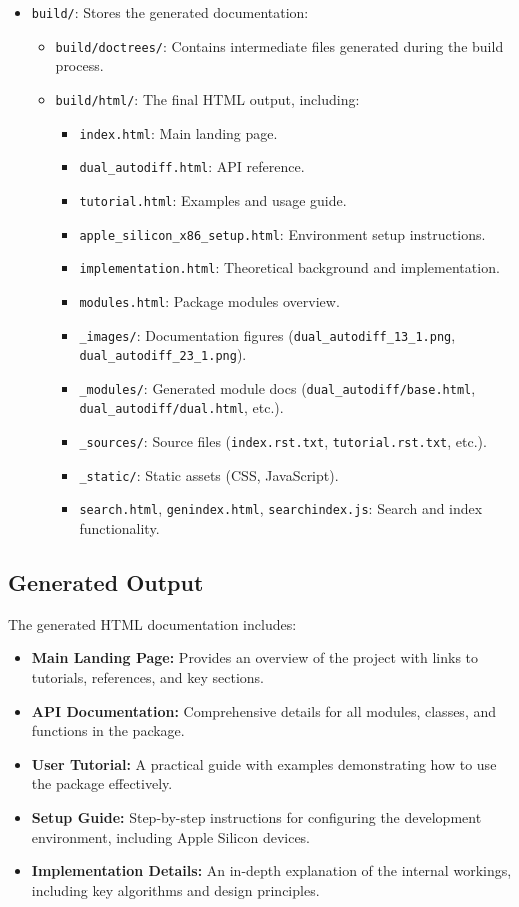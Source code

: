 \documentclass[a4paper,12pt]{article}
\begin{document}
\begin{itemize}
    \item \texttt{build/}: Stores the generated documentation:
    \begin{itemize}
        \item \texttt{build/doctrees/}: Contains intermediate files generated during the build process.
        \item \texttt{build/html/}: The final HTML output, including:
\begin{itemize}
    \item \texttt{index.html}: Main landing page.
    \item \texttt{dual\_autodiff.html}: API reference.
    \item \texttt{tutorial.html}: Examples and usage guide.
    \item \texttt{apple\_silicon\_x86\_setup.html}: Environment setup instructions.
    \item \texttt{implementation.html}: Theoretical background and implementation.
    \item \texttt{modules.html}: Package modules overview.
    \item \texttt{\_images/}: Documentation figures (\texttt{dual\_autodiff\_13\_1.png}, \texttt{dual\_autodiff\_23\_1.png}).
    \item \texttt{\_modules/}: Generated module docs (\texttt{dual\_autodiff/base.html}, \texttt{dual\_autodiff/dual.html}, etc.).
    \item \texttt{\_sources/}: Source files (\texttt{index.rst.txt}, \texttt{tutorial.rst.txt}, etc.).
    \item \texttt{\_static/}: Static assets (CSS, JavaScript).
    \item \texttt{search.html}, \texttt{genindex.html}, \texttt{searchindex.js}: Search and index functionality.
\end{itemize}

    \end{itemize}
\end{itemize}

\subsection{Generated Output}
The generated HTML documentation includes:
\begin{itemize}
    \item \textbf{Main Landing Page:} Provides an overview of the project with links to tutorials, references, and key sections.
    \item \textbf{API Documentation:} Comprehensive details for all modules, classes, and functions in the package.
    \item \textbf{User Tutorial:} A practical guide with examples demonstrating how to use the package effectively.
    \item \textbf{Setup Guide:} Step-by-step instructions for configuring the development environment, including Apple Silicon devices.
    \item \textbf{Implementation Details:} An in-depth explanation of the internal workings, including key algorithms and design principles.
\end{itemize}
\end{document}
